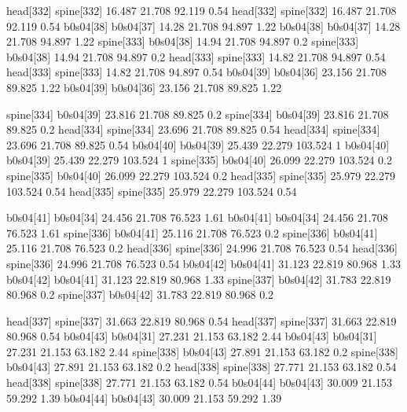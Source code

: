head[332]    spine[332]    16.487    21.708    92.119    0.54
head[332]    spine[332]    16.487    21.708    92.119    0.54
b0s04[38]    b0s04[37]    14.28    21.708    94.897    1.22
b0s04[38]    b0s04[37]    14.28    21.708    94.897    1.22
spine[333]    b0s04[38]    14.94    21.708    94.897    0.2
spine[333]    b0s04[38]    14.94    21.708    94.897    0.2
head[333]    spine[333]    14.82    21.708    94.897    0.54
head[333]    spine[333]    14.82    21.708    94.897    0.54
b0s04[39]    b0s04[36]    23.156    21.708    89.825    1.22
b0s04[39]    b0s04[36]    23.156    21.708    89.825    1.22


spine[334]    b0s04[39]    23.816    21.708    89.825    0.2
spine[334]    b0s04[39]    23.816    21.708    89.825    0.2
head[334]    spine[334]    23.696    21.708    89.825    0.54
head[334]    spine[334]    23.696    21.708    89.825    0.54
b0s04[40]    b0s04[39]    25.439    22.279    103.524    1
b0s04[40]    b0s04[39]    25.439    22.279    103.524    1
spine[335]    b0s04[40]    26.099    22.279    103.524    0.2
spine[335]    b0s04[40]    26.099    22.279    103.524    0.2
head[335]    spine[335]    25.979    22.279    103.524    0.54
head[335]    spine[335]    25.979    22.279    103.524    0.54


b0s04[41]    b0s04[34]    24.456    21.708    76.523    1.61
b0s04[41]    b0s04[34]    24.456    21.708    76.523    1.61
spine[336]    b0s04[41]    25.116    21.708    76.523    0.2
spine[336]    b0s04[41]    25.116    21.708    76.523    0.2
head[336]    spine[336]    24.996    21.708    76.523    0.54
head[336]    spine[336]    24.996    21.708    76.523    0.54
b0s04[42]    b0s04[41]    31.123    22.819    80.968    1.33
b0s04[42]    b0s04[41]    31.123    22.819    80.968    1.33
spine[337]    b0s04[42]    31.783    22.819    80.968    0.2
spine[337]    b0s04[42]    31.783    22.819    80.968    0.2


head[337]    spine[337]    31.663    22.819    80.968    0.54
head[337]    spine[337]    31.663    22.819    80.968    0.54
b0s04[43]    b0s04[31]    27.231    21.153    63.182    2.44
b0s04[43]    b0s04[31]    27.231    21.153    63.182    2.44
spine[338]    b0s04[43]    27.891    21.153    63.182    0.2
spine[338]    b0s04[43]    27.891    21.153    63.182    0.2
head[338]    spine[338]    27.771    21.153    63.182    0.54
head[338]    spine[338]    27.771    21.153    63.182    0.54
b0s04[44]    b0s04[43]    30.009    21.153    59.292    1.39
b0s04[44]    b0s04[43]    30.009    21.153    59.292    1.39



